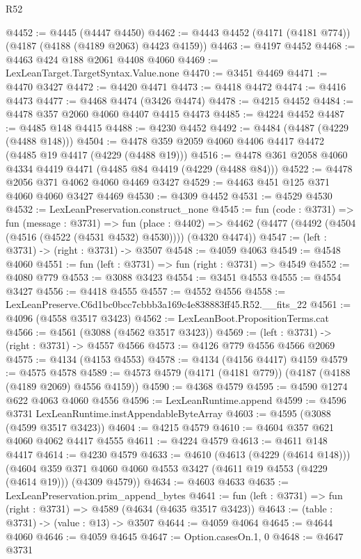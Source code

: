 \begin{lexlean}{R52}
\begin{coremodule}
@4452 := @4445 (@4447 @4450)
@4462 := @4443 @4452 (@4171 (@4181 @774)) (@4187 (@4188 (@4189 @2063) @4423 @4159))
@4463 := @4197 @4452
@4468 := @4463 @424 @188 @2061 @4408 @4060
@4469 := LexLeanTarget.TargetSyntax.Value.none
@4470 := @3451 @4469
@4471 := @4470 @3427
@4472 := @4420 @4471
@4473 := @4418 @4472
@4474 := @4416 @4473
@4477 := @4468 @4474 (@3426 @4474)
@4478 := @4215 @4452
@4484 := @4478 @357 @2060 @4060 @4407 @4415 @4473
@4485 := @4224 @4452
@4487 := @4485 @148 @4415
@4488 := @4230 @4452
@4492 := @4484 (@4487 (@4229 (@4488 @148)))
@4504 := @4478 @359 @2059 @4060 @4406 @4417 @4472 (@4485 @19 @4417 (@4229 (@4488 @19)))
@4516 := @4478 @361 @2058 @4060 @4334 @4419 @4471 (@4485 @84 @4419 (@4229 (@4488 @84)))
@4522 := @4478 @2056 @371 @4062 @4060 @4469 @3427
@4529 := @4463 @451 @125 @371 @4060 @4060 @3427 @4469
@4530 := @4309 @4452
@4531 := @4529 @4530
@4532 := LexLeanPreservation.construct_none
@4545 := fun (code : @3731) =>
  fun (message : @3731) =>
  fun (place : @4402) =>
  @4462 (@4477 (@4492 (@4504 (@4516 (@4522 (@4531 @4532) @4530)))) (@4320 @4474))
@4547 := (left : @3731) -> (right : @3731) -> @3507
@4548 := @4059 @4063
@4549 := @4548 @4060
@4551 := fun (left : @3731) => fun (right : @3731) => @4549
@4552 := @4080 @779
@4553 := @3088 @3423
@4554 := @3451 @4553
@4555 := @4554 @3427
@4556 := @4418 @4555
@4557 := @4552 @4556
@4558 := LexLeanPreserve.C6d1bc0bcc7cbbb3a169c4e838883ff45.R52.__fits_22
@4561 := @4096 (@4558 @3517 @3423)
@4562 := LexLeanBoot.PropositionTerms.cat
@4566 := @4561 (@3088 (@4562 @3517 @3423))
@4569 := (left : @3731) -> (right : @3731) -> @4557 @4566
@4573 := @4126 @779 @4556 @4566 @2069
@4575 := @4134 (@4153 @4553)
@4578 := @4134 (@4156 @4417) @4159
@4579 := @4575 @4578
@4589 := @4573 @4579 (@4171 (@4181 @779)) (@4187 (@4188 (@4189 @2069) @4556 @4159))
@4590 := @4368 @4579
@4595 := @4590 @1274 @622 @4063 @4060 @4556
@4596 := LexLeanRuntime.append
@4599 := @4596 @3731 LexLeanRuntime.instAppendableByteArray
@4603 := @4595 (@3088 (@4599 @3517 @3423))
@4604 := @4215 @4579
@4610 := @4604 @357 @621 @4060 @4062 @4417 @4555
@4611 := @4224 @4579
@4613 := @4611 @148 @4417
@4614 := @4230 @4579
@4633 := @4610
    (@4613 (@4229 (@4614 @148)))
    (@4604 @359 @371 @4060 @4060 @4553 @3427 (@4611 @19 @4553 (@4229 (@4614 @19))) (@4309 @4579))
@4634 := @4603 @4633
@4635 := LexLeanPreservation.prim_append_bytes
@4641 := fun (left : @3731) => fun (right : @3731) => @4589 (@4634 (@4635 @3517 @3423))
@4643 := (table : @3731) -> (value : @13) -> @3507
@4644 := @4059 @4064
@4645 := @4644 @4060
@4646 := @4059 @4645
@4647 := Option.casesOn.{1, 0}
@4648 := @4647 @3731

\end{coremodule}
\end{lexlean}
